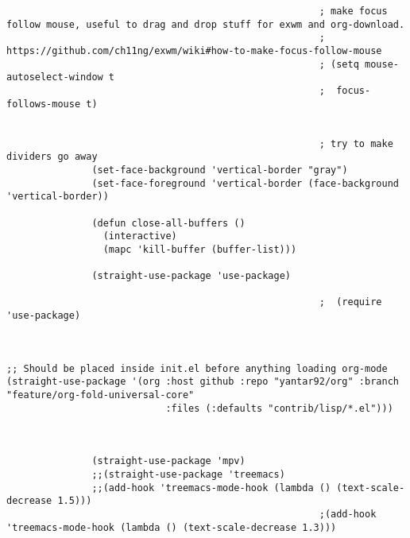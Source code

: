 \documentclass[11pt]{article}
\begin{document}
\begin{verbatim}
                                                       ; make focus follow mouse, useful to drag and drop stuff for exwm and org-download.
                                                       ; https://github.com/ch11ng/exwm/wiki#how-to-make-focus-follow-mouse
                                                       ; (setq mouse-autoselect-window t
                                                       ;  focus-follows-mouse t)


                                                       ; try to make dividers go away
               (set-face-background 'vertical-border "gray")
               (set-face-foreground 'vertical-border (face-background 'vertical-border))

               (defun close-all-buffers ()
                 (interactive)
                 (mapc 'kill-buffer (buffer-list)))

               (straight-use-package 'use-package)

                                                       ;  (require 'use-package)



;; Should be placed inside init.el before anything loading org-mode 
(straight-use-package '(org :host github :repo "yantar92/org" :branch "feature/org-fold-universal-core"
                            :files (:defaults "contrib/lisp/*.el")))



               (straight-use-package 'mpv) 
               ;;(straight-use-package 'treemacs)
               ;;(add-hook 'treemacs-mode-hook (lambda () (text-scale-decrease 1.5)))
                                                       ;(add-hook 'treemacs-mode-hook (lambda () (text-scale-decrease 1.3)))


\end{verbatim}
\end{document}
